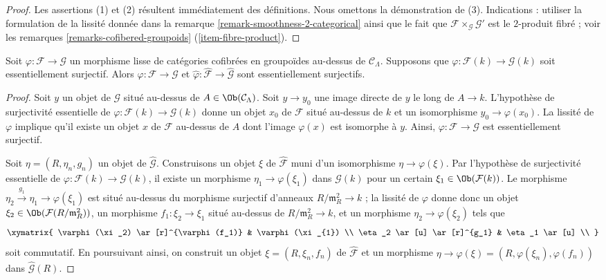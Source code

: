\begin{proof}
Les assertions (1) et (2) résultent immédiatement des définitions. Nous
omettons la démonstration de (3). Indications : utiliser la formulation de la
lissité donnée dans la remarque \ref{remark-smoothness-2-categorical} ainsi
que le fait que $\mathcal{F} \times_\mathcal{G} \mathcal{G}'$ est le
$2$-produit fibré ; voir les remarques \ref{remarks-cofibered-groupoids}
(\ref{item-fibre-product}).
\end{proof}

\begin{lemma}
\label{lemma-smooth-morphism-essentially-surjective}
Soit $\varphi : \mathcal{F} \to \mathcal{G}$ un morphisme lisse de
catégories cofibrées en groupoïdes au-dessus de $\mathcal{C}_\Lambda$.
Supposons que $\varphi : \mathcal{F}(k) \to \mathcal{G}(k)$ soit
essentiellement surjectif. Alors $\varphi : \mathcal{F} \to \mathcal{G}$ et
$\widehat{\varphi} : \widehat{\mathcal{F}} \to \widehat{\mathcal{G}}$
sont essentiellement surjectifs.
\end{lemma}

\begin{proof}
Soit $y$ un objet de $\mathcal{G}$ situé au-dessus de
$A \in \Ob(\mathcal{C}_\Lambda)$. Soit $y \to y_0$ une image directe de $y$
le long de $A \to k$. L'hypothèse de surjectivité essentielle de
$\varphi : \mathcal{F}(k) \to \mathcal{G}(k)$ donne un objet $x_0$ de
$\mathcal{F}$ situé au-dessus de $k$ et un isomorphisme
$y_0 \to \varphi(x_0)$. La lissité de $\varphi$ implique qu'il existe un
objet $x$ de $\mathcal{F}$ au-dessus de $A$ dont l'image $\varphi(x)$ est
isomorphe à $y$. Ainsi, $\varphi : \mathcal{F} \to \mathcal{G}$ est
essentiellement surjectif.

\medskip\noindent
Soit $\eta = (R, \eta_n, g_n)$ un objet de $\widehat{\mathcal{G}}$.
Construisons un objet $\xi$ de $\widehat{\mathcal{F}}$ muni d'un isomorphisme
$\eta \to \varphi(\xi)$. Par l'hypothèse de surjectivité essentielle de
$\varphi : \mathcal{F}(k) \to \mathcal{G}(k)$, il existe un morphisme
$\eta_1 \to \varphi(\xi_1)$ dans $\mathcal{G}(k)$ pour un certain
$\xi_1 \in \Ob(\mathcal{F}(k))$. Le morphisme
$\eta_2 \xrightarrow{g_1} \eta_1 \to \varphi(\xi_1)$
est situé au-dessus du morphisme surjectif d'anneaux
$R/\mathfrak m_R^2 \to k$ ; la lissité de $\varphi$ donne donc un objet
$\xi_2 \in \Ob(\mathcal{F}(R/\mathfrak m_R^2))$, un morphisme
$f_1: \xi_2 \to \xi_1$ situé au-dessus de $R/\mathfrak m_R^2 \to k$, et un
morphisme $\eta_2 \to \varphi(\xi_2)$ tels que
$$
\xymatrix{
\varphi(\xi_2)  \ar[r]^{\varphi(f_1)} &  \varphi(\xi_{1})   \\
\eta_2   \ar[u] \ar[r]^{g_1}  & \eta_1  \ar[u] \\
}
$$
soit commutatif. En poursuivant ainsi, on construit un objet
$\xi = (R, \xi_n, f_n)$ de $\widehat{\mathcal{F}}$ et un morphisme
$\eta \to \varphi(\xi) = (R, \varphi(\xi_n), \varphi(f_n))$ dans
$\widehat{\mathcal{G}}(R)$.
\end{proof}

